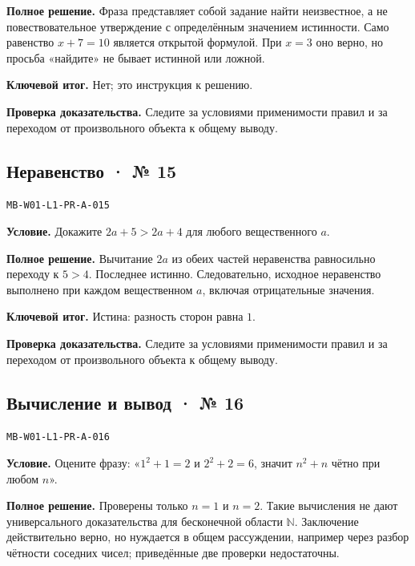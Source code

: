 \documentclass[11pt,a4paper,openany]{book}
\newcommand{\muid}[1]{\texttt{\footnotesize #1}}
\begin{document}
\textbf{Полное решение.} Фраза представляет собой задание найти неизвестное, а не повествовательное утверждение с определённым значением истинности. Само равенство $x+7=10$ является открытой формулой. При $x=3$ оно верно, но просьба «найдите» не бывает истинной или ложной.


\begin{learnbox}\textbf{Ключевой итог.} Нет; это инструкция к решению.\par \textbf{Проверка доказательства.} 
Следите за условиями применимости правил и за переходом от произвольного объекта к общему выводу. 
\end{learnbox}

\subsection*{Неравенство · № 15}\hypertarget{solution:MB-W01-L1-PR-A-015}{}

\muid{MB-W01-L1-PR-A-015}\par

\textbf{Условие.} Докажите $2a+5>2a+4$ для любого вещественного $a$.\par

\textbf{Полное решение.} Вычитание $2a$ из обеих частей неравенства равносильно переходу к $5>4$. Последнее истинно. Следовательно, исходное неравенство выполнено при каждом вещественном $a$, включая отрицательные значения.


\begin{learnbox}\textbf{Ключевой итог.} Истина: разность сторон равна $1$.\par \textbf{Проверка доказательства.} 
Следите за условиями применимости правил и за переходом от произвольного объекта к общему выводу. 
\end{learnbox}

\subsection*{Вычисление и вывод · № 16}\hypertarget{solution:MB-W01-L1-PR-A-016}{}

\muid{MB-W01-L1-PR-A-016}\par

\textbf{Условие.} Оцените фразу: «$1^2+1=2$ и $2^2+2=6$, значит $n^2+n$ чётно при любом $n$».\par

\textbf{Полное решение.} Проверены только $n=1$ и $n=2$. Такие вычисления не дают универсального доказательства для бесконечной области $\mathbb N$. Заключение действительно верно, но нуждается в общем рассуждении, например через разбор чётности соседних чисел; приведённые две проверки недостаточны.
\end{document}
